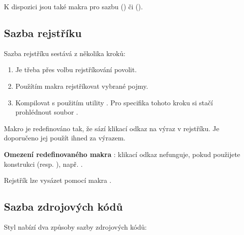 \documentclass[
  program=itp,
  biblatex,
  figures=false,
  glossaries,
  index
]{kidiplom}
\begin{document}
K dispozici jsou také makra pro sazbu \csharp{} () či \cpp{} ().


\subsection{Sazba rejstříku}
Sazba rejstříku sestává z několika kroků:

\begin{enumerate}
\item Je třeba přes volbu  rejstříkování povolit.
\item Použítím makra  rejstříkovat vybrané pojmy.
\item Kompilovat s použitím utility . Pro specifika tohoto kroku si stačí prohlédnout soubor .
\end{enumerate}

Makro  je redefinováno tak, že sází klikací odkaz na výraz v rejstříku. Je doporučeno jej použít ihned za výrazem.

\textbf{Omezení redefinovaného makra }: klikací odkaz nefunguje, pokud použijete konstrukci  (resp. ), např. .

Rejstřík lze vysázet pomocí makra .

\subsection{Sazba zdrojových kódů}
Styl nabízí dva způsoby sazby zdrojových kódů:
\end{document}

